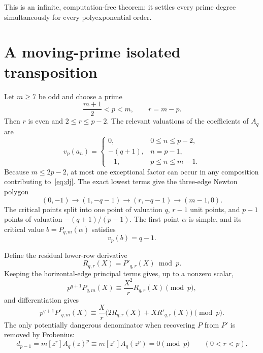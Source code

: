 \documentclass[11pt]{article}
\theoremstyle{keio}
\theoremstyle{keioinput}
\begin{document}
This is an infinite, computation-free theorem: it settles every prime
degree simultaneously for every polyexponential order.

\section{A moving-prime isolated transposition}

Let $m\ge7$ be odd and choose a prime
\begin{equation}
\frac{m+1}{2}<p<m,
\qquad
r=m-p.
\label{eq:window}
\end{equation}
Then $r$ is even and $2\le r\le p-2$. The relevant valuations of the
coefficients of $A_q$ are
\[
v_p(a_n)=
\begin{cases}
0,&0\le n\le p-2,\\
-(q+1),&n=p-1,\\
-1,&p\le n\le m-1.
\end{cases}
\]
Because $m\le2p-2$, at most one exceptional factor can occur in any
composition contributing to~\eqref{eq:dj}. The exact lowest terms give the
three-edge Newton polygon
\begin{equation}
(0,-1)\longrightarrow(1,-q-1)
\longrightarrow(r,-q-1)\longrightarrow(m-1,0).
\label{eq:threeedge}
\end{equation}
The critical points split into one point of valuation $q$, $r-1$ unit
points, and $p-1$ points of valuation $-(q+1)/(p-1)$. The first point
$\alpha$ is simple, and its critical value $b=P_{q,m}(\alpha)$ satisfies
\begin{equation}
\boxed{v_p(b)=q-1.}
\label{eq:bval}
\end{equation}

Define the residual lower-row derivative
\[
R_{q,r}(X)=P'_{q,r}(X)\bmod p.
\]
Keeping the horizontal-edge principal terms gives, up to a nonzero scalar,
\begin{equation}
p^{q+1}P_{q,m}(X)\equiv\frac{X^2}{r}R_{q,r}(X)\pmod p,
\label{eq:lowerP}
\end{equation}
and differentiation gives
\begin{equation}
p^{q+1}P'_{q,m}(X)
\equiv\frac{X}{r}\bigl(2R_{q,r}(X)+XR'_{q,r}(X)\bigr)\pmod p.
\label{eq:lowerPd}
\end{equation}
The only potentially dangerous denominator when recovering $P$ from $P'$ is
removed by Frobenius:
\begin{equation}
d_{p-1}=m[z^r]A_q(z)^p
\equiv m[z^r]A_q(z^p)=0\pmod p
\qquad(0<r<p).
\label{eq:frob}
\end{equation}
\end{document}
